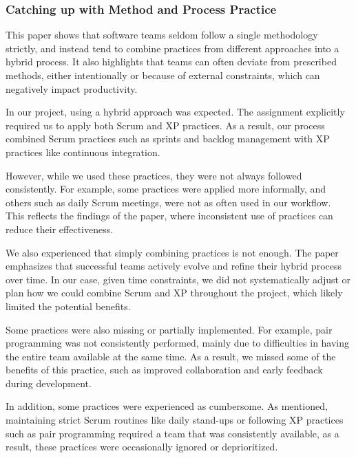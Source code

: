 

\subsubsection{Catching up with Method and Process Practice}
This paper shows that software teams seldom follow a single methodology strictly, and instead tend to combine practices from different approaches into a hybrid process. 
It also highlights that teams can often deviate from prescribed methods, either intentionally or because of external constraints, which can negatively impact productivity.

In our project, using a hybrid approach was expected.
The assignment explicitly required us to apply both Scrum and XP practices.
As a result, our process combined Scrum practices such as sprints and backlog management with XP practices like continuous integration.

However, while we used these practices, they were not always followed consistently.
For example, some practices were applied more informally, and others such as daily Scrum meetings, were not as often used in our workflow.
This reflects the findings of the paper, where inconsistent use of practices can reduce their effectiveness.

We also experienced that simply combining practices is not enough.
The paper emphasizes that successful teams actively evolve and refine their hybrid process over time.
In our case, given time constraints, we did not systematically adjust or plan how we could combine Scrum and XP 
throughout the project, which likely limited the potential benefits.

Some practices were also missing or partially implemented.
For example, pair programming was not consistently performed, mainly due to difficulties in having the entire team available at the same time.
As a result, we missed some of the benefits of this practice, such as improved collaboration and early feedback during development.

In addition, some practices were experienced as cumbersome.
As mentioned, maintaining strict Scrum routines like daily stand-ups or following XP practices such as pair programming required a 
team that was consistently available, as a result, these practices were occasionally ignored or deprioritized.

